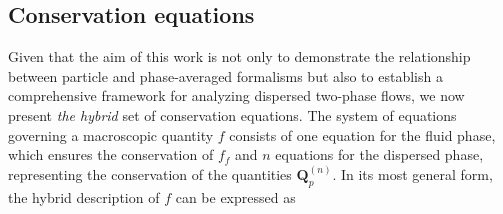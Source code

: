 \subsection{Conservation equations}

Given that the aim of this work is not only to demonstrate the relationship between particle and phase-averaged formalisms but also to establish a comprehensive framework for analyzing dispersed two-phase flows, we now present \textit{the hybrid} set of conservation equations.
The system of equations governing a macroscopic quantity $f$ consists of one equation for the fluid phase, which ensures the conservation of $f_f$ and $n$ equations for the dispersed phase, representing the conservation of the quantities $\textbf{Q}_p^{(n)}$.  
In its most general form, the hybrid description of $f$ can be expressed as
